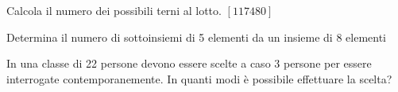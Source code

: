 \begin{esercizio}
\label{ese:C.2}
Calcola il numero dei possibili terni al lotto.
\hfill $\left[117480\right]$
\end{esercizio}

\begin{esercizio}
\label{ese:C.3}
Determina il numero di sottoinsiemi di 5 elementi da un insieme di 8 elementi
\end{esercizio}

\begin{esercizio}
\label{ese:C.4}
In una classe di 22 persone devono essere scelte a caso 3 persone per essere interrogate contemporanemente. In quanti modi è possibile effettuare la scelta?
\end{esercizio}


\begin{comment}
\subsection{Esercizi riepilogativi}

\begin{esercizio}
\label{ese:R.1}
Quante sono le diagonali di un ottagono?
\end{esercizio}

\begin{esercizio}
\label{ese:R.2}
In un torneo di calcio a otto squadre, ogni squadra deve giocare una partita contro ognuna delle altre. Quante partite si giocheranno?
\end{esercizio}
\end{comment}
